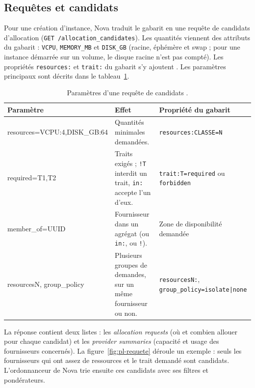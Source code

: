 \subsection{Requêtes et candidats}\label{sec:pl-requetes}

Pour une création d'instance, Nova traduit le gabarit en une requête de candidats d'allocation
(\texttt{GET /allocation\_candidates}). Les quantités viennent des attributs du gabarit : \texttt{VCPU},
\texttt{MEMORY\_MB} et \texttt{DISK\_GB} (racine, éphémère et swap ; pour une instance démarrée sur un volume,
le disque racine n'est pas compté). Les propriétés \texttt{resources:} et \texttt{trait:} du gabarit s'y ajoutent
\parencite{nova-flavors}. Les paramètres principaux sont décrits dans le tableau~\ref{tab:pl-requete}.

\begin{table}[!ht]
\centering
\renewcommand{\arraystretch}{1.3}
\begin{tabular}{@{}>{\raggedright\arraybackslash\ttfamily}p{4.2cm}>{\raggedright\arraybackslash}p{6.2cm}>{\raggedright\arraybackslash}p{5.1cm}@{}}
\toprule
\textrm{\textbf{Paramètre}} & \textbf{Effet} & \textbf{Propriété du gabarit} \\
\midrule
resources=\allowbreak VCPU:4,\allowbreak DISK\_GB:64 & Quantités minimales demandées. & \texttt{resources:CLASSE=N} \\
required=T1,T2 & Traits exigés ; \texttt{!T} interdit un trait, \texttt{in:} accepte l'un d'eux. & \texttt{trait:T=required} ou \texttt{forbidden} \\
member\_of=UUID & Fournisseur dans un agrégat (ou \texttt{in:}, ou \texttt{!}). & Zone de disponibilité demandée \\
resourcesN, group\_policy & Plusieurs groupes de demandes, sur un même fournisseur ou non. & \texttt{resourcesN:}, \texttt{group\_policy=isolate|none} \\
\bottomrule
\end{tabular}
\caption{Paramètres d'une requête de candidats \parencite{placement-api-ref}.}
\label{tab:pl-requete}
\end{table}

La réponse contient deux listes : les \emph{allocation requests} (où et combien allouer pour chaque candidat)
et les \emph{provider summaries} (capacité et usage des fournisseurs concernés). La figure~\ref{fig:pl-requete}
déroule un exemple : seuls les fournisseurs qui ont assez de ressources et le trait demandé sont candidats.
L'ordonnanceur de Nova trie ensuite ces candidats avec ses filtres et pondérateurs.

